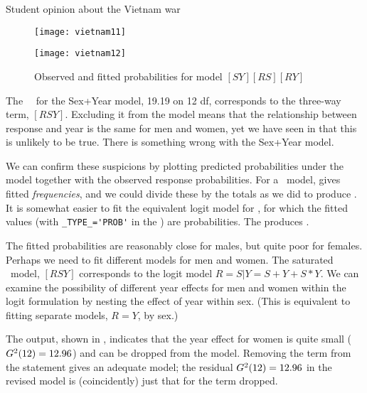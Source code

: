 \begin{Example}[vietnam1]{Student opinion about the Vietnam war}
\begin{Output}[htb]
\caption{Model fit summaries for initial models, Vietnam war data}\label{out:vietnam1.1}
\small

\end{Output}

\begin{figure}[htb]
 \begin{minipage}[t]{.49\linewidth}
  \texttt{[image: vietnam11]}
 \end{minipage}%
 \hfill
 \begin{minipage}[t]{.49\linewidth}
  \texttt{[image: vietnam12]}
 \end{minipage}
 \caption{Observed and fitted probabilities for model $[SY][RS][RY]$}\label{fig:vietnam1}
\end{figure}

The \LR\ \GSQ\ for the Sex+Year model, 19.19 on 12 df, corresponds to the three-way
term, $[RSY]$.  Excluding it from the model means that the
relationship between response and year is the same for men and
women, yet we have seen in  that this
is unlikely to be true.  There is something wrong with the Sex+Year
model.

We can confirm these suspicions by plotting predicted probabilities
under the model together with the observed response probabilities.
For a \loglin\ model,
 gives fitted \emph{frequencies}, and we could divide these
by the totals as we did to produce .
It is somewhat easier to fit the equivalent logit model for ,
for which the fitted values (with \verb|_TYPE_='PROB'| in the \ODS) are probabilities.
The  produces .


The fitted probabilities are reasonably close for males, but quite poor for females.  Perhaps we need to fit different models for men and women.
The saturated \loglin\ model, $[RSY]$ corresponds to the logit model
$R = S | Y = S + Y + S*Y$.
We can examine the possibility of different year effects for men and women within the logit formulation by nesting the effect of year within sex.
(This is equivalent to fitting separate models, $R = Y$, by sex.)


The output, shown in , indicates that the year
effect for women is quite small ($G^2(12) = 12.96$) and can be dropped
from the model.
Removing the term  from the  statement
gives an adequate model;
the residual $G^2(12) = 12.96$ in the revised model
is (coincidently) just that for the term dropped.
\begin{Output}[htb]
\caption{Vietnam war data, Nested year effect model}\label{out:vietnam1.2}
\small

\end{Output}


\end{Example}
